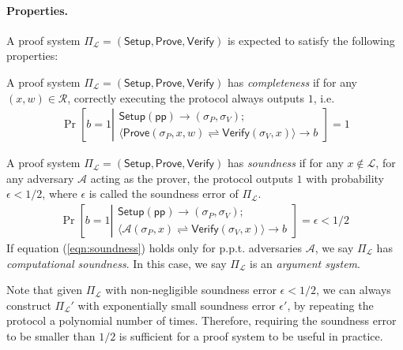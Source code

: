 \documentclass[acmtog]{acmart}
\newcommand{\cA}{\mathcal{A}}
\newcommand{\cL}{\mathcal{L}}
\newcommand{\cR}{\mathcal{R}}
\newcommand{\Setup}{\mathsf{Setup}}
\newcommand{\Prove}{\mathsf{Prove}}
\newcommand{\Verify}{\mathsf{Verify}}
\newcommand{\pp}{\mathsf{pp}}
\newcommand{\PiL}{\Pi_{\cL}}
\begin{document}
\paragraph{Properties.}
A proof system $\PiL=(\Setup,\Prove,\Verify)$ is expected to satisfy the following properties:

\begin{definition}[Completeness]
\label{def:completeness}
A proof system $\PiL=(\Setup,\Prove,\Verify)$ has \emph{completeness} if for any $(x,w)\in\cR$, correctly executing the protocol always outputs $1$, i.e.
	\begin{eqnarray}
	\Pr\left[b=1\left|
	\begin{matrix}
	\Setup(\pp)\to(\sigma_P,\sigma_V);\\
	\langle\Prove(\sigma_P, x, w)\rightleftharpoons\Verify(\sigma_V, x)\rangle\to b
	\end{matrix}
	\right.\right]=1
	\end{eqnarray}
\end{definition}

\begin{definition}[Soundness]
\label{def:soundness}
	A proof system $\PiL=(\Setup,\Prove,\Verify)$ has \emph{soundness} if for any $x\notin\cL$, for any adversary $\cA$ acting as the prover, the protocol outputs $1$ with probability $\epsilon < 1/2$, where $\epsilon$ is called the soundness error of $\PiL$.
	\begin{eqnarray}
	\label{eqn:soundness}
	\Pr\left[b=1\left|
	\begin{matrix}
	\Setup(\pp)\to(\sigma_P,\sigma_V);\\
	\langle\cA(\sigma_P, x)\rightleftharpoons\Verify(\sigma_V, x)\rangle\to b
	\end{matrix}
	\right.\right]=\epsilon < 1/2\,
	\end{eqnarray}
	If equation (\ref{eqn:soundness}) holds only for p.p.t. adversaries $\cA$, we say $\PiL$ has \emph{computational soundness}.
	In this case, we say $\PiL$ is an \emph{argument system}.
\end{definition}

Note that given $\PiL$ with non-negligible soundness error $\epsilon < 1/2$, we can always construct $\PiL'$ with exponentially small soundness error $\epsilon'$, by repeating the protocol a polynomial number of times.
Therefore, requiring the soundness error to be smaller than $1/2$ is sufficient for a proof system to be useful in practice.
\end{document}
